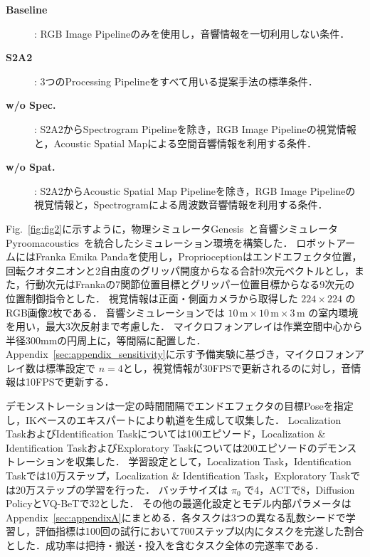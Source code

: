 \documentclass{article}
\begin{document}
	\begin{description}
		\item[\textbf{Baseline}]: RGB Image Pipelineのみを使用し，音響情報を一切利用しない条件．
		\item[\textbf{S2A2}]: 3つのProcessing Pipelineをすべて用いる提案手法の標準条件．
		\item[\textbf{w/o Spec.}]: S2A2からSpectrogram Pipelineを除き，RGB Image Pipelineの視覚情報と，Acoustic Spatial Mapによる空間音響情報を利用する条件．
		\item[\textbf{w/o Spat.}]: S2A2からAcoustic Spatial Map Pipelineを除き，RGB Image Pipelineの視覚情報と，Spectrogramによる周波数音響情報を利用する条件．
	\end{description}

	Fig.~\ref{fig:fig2}に示すように，物理シミュレータGenesis~\citep{Genesis}と音響シミュレータPyroomacoustics~\citep{pyroomacoustics}を統合したシミュレーション環境を構築した．
	ロボットアームにはFranka Emika Pandaを使用し，Proprioceptionはエンドエフェクタ位置，回転クオタニオンと2自由度のグリッパ開度からなる合計9次元ベクトルとし，また，行動次元はFrankaの7関節位置目標とグリッパー位置目標からなる9次元の位置制御指令とした．
	視覚情報は正面・側面カメラから取得した $224 \times 224$ のRGB画像2枚である．
	音響シミュレーションでは $10\,\mathrm{m}\times10\,\mathrm{m}\times3\,\mathrm{m}$ の室内環境を用い，最大3次反射まで考慮した．
	マイクロフォンアレイは作業空間中心から半径300mmの円周上に，等間隔に配置した．
	Appendix~\ref{sec:appendix_sensitivity}に示す予備実験に基づき，マイクロフォンアレイ数は標準設定で $n=4$とし，視覚情報が30FPSで更新されるのに対し，音情報は10FPSで更新する．

	デモンストレーションは一定の時間間隔でエンドエフェクタの目標Poseを指定し，IKベースのエキスパートにより軌道を生成して収集した．
	Localization TaskおよびIdentification Taskについては100エピソード，Localization \& Identification TaskおよびExploratory Taskについては200エピソードのデモンストレーションを収集した．
	学習設定として，Localization Task，Identification Taskでは10万ステップ，Localization \& Identification Task，Exploratory Taskでは20万ステップの学習を行った．
	バッチサイズは $\pi_0$ で4，ACTで8，Diffusion PolicyとVQ-BeTで32とした．
	その他の最適化設定とモデル内部パラメータはAppendix~\ref{sec:appendixA}にまとめる．各タスクは3つの異なる乱数シードで学習し，評価指標は100回の試行において700ステップ以内にタスクを完遂した割合とした．成功率は把持・搬送・投入を含むタスク全体の完遂率である．
\end{document}
